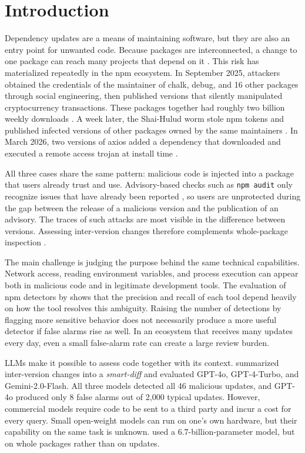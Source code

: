 \documentclass[a4paper,fleqn]{cas-dc}
\begin{document}
\section{Introduction}\label{sec:intro}
Dependency updates are a means of maintaining software, but they are also an
entry point for unwanted code. Because packages are interconnected, a change to
one package can reach many projects that depend on it
\citep{zimmermann2019small}. This risk has materialized repeatedly in the npm
ecosystem. In September 2025, attackers obtained the credentials of the
maintainer of chalk, debug, and 16 other packages through social engineering,
then published versions that silently manipulated cryptocurrency transactions.
These packages together had roughly two billion weekly downloads
\citep{aws2025chalk}. A week later, the Shai-Hulud worm stole npm tokens and
published infected versions of other packages owned by the same maintainers
\citep{aws2025chalk,unit42shaihulud}. In March 2026, two versions of axios added
a dependency that downloaded and executed a remote access trojan at install time
\citep{datadog2026axios}.

All three cases share the same pattern: malicious code is injected into a
package that users already trust and use. Advisory-based checks such as
\texttt{npm audit} only recognize issues that have already been reported
\citep{npmaudit}, so users are unprotected during the gap between the release of
a malicious version and the publication of an advisory. The traces of such
attacks are most visible in the difference between versions. Assessing
inter-version changes therefore complements whole-package inspection
\citep{sofaer2024rogueone}.

The main challenge is judging the purpose behind the same technical
capabilities. Network access, reading environment variables, and process
execution can appear both in malicious code and in legitimate development
tools. The evaluation of npm detectors by \citet{guo2026effective} shows that
the precision and recall of each tool depend heavily on how the tool
resolves this ambiguity. Raising the number of detections by flagging more
sensitive behavior does not necessarily produce a more useful detector if false
alarms rise as well. In an ecosystem that receives many updates every day, even
a small false-alarm rate can create a large review burden.

LLMs make it possible to assess code together with its context.
\citet{wyss2025evaluating} summarized inter-version changes into a
\emph{smart-diff} and evaluated GPT-4o, GPT-4-Turbo, and Gemini-2.0-Flash. All
three models detected all 46 malicious updates, and GPT-4o produced only 8 false
alarms out of 2,000 typical updates. However, commercial models require code to
be sent to a third party and incur a cost for every query. Small
open-weight models can run on one's own hardware, but their capability on
the same task is unknown. \citet{nguyen2025taint} used a 6.7-billion-parameter
model, but on whole packages rather than on updates.
\end{document}
